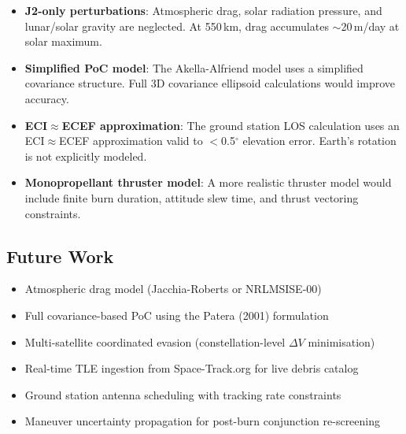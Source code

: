 \documentclass[12pt,a4paper]{article}
\begin{document}
\begin{itemize}[noitemsep]
  \item \textbf{J2-only perturbations}: Atmospheric drag, solar radiation pressure, and lunar/solar gravity are neglected. At 550\,km, drag accumulates $\sim$20\,m/day at solar maximum.
  \item \textbf{Simplified PoC model}: The Akella-Alfriend model uses a simplified covariance structure. Full 3D covariance ellipsoid calculations would improve accuracy.
  \item \textbf{ECI$\approx$ECEF approximation}: The ground station LOS calculation uses an ECI$\approx$ECEF approximation valid to $<$0.5$^\circ$ elevation error. Earth's rotation is not explicitly modeled.
  \item \textbf{Monopropellant thruster model}: A more realistic thruster model would include finite burn duration, attitude slew time, and thrust vectoring constraints.
\end{itemize}

\subsection{Future Work}

\begin{itemize}[noitemsep]
  \item Atmospheric drag model (Jacchia-Roberts or NRLMSISE-00)
  \item Full covariance-based PoC using the Patera (2001) formulation
  \item Multi-satellite coordinated evasion (constellation-level $\Delta V$ minimisation)
  \item Real-time TLE ingestion from Space-Track.org for live debris catalog
  \item Ground station antenna scheduling with tracking rate constraints
  \item Maneuver uncertainty propagation for post-burn conjunction re-screening
\end{itemize}

\end{document}
